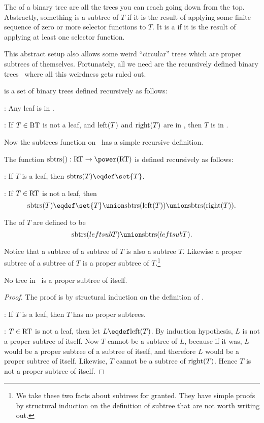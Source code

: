 The  of a binary tree are all the trees you can reach
going down from the top.  Abstractly, something is a subtree of $T$ if
it is the result of applying some finite sequence of zero or more
selector functions to $T$.  It is a  if it is the
result of applying at least one selector function.

This abstract setup also allows some weird ``circular'' trees which
are proper subtrees of themselves.  Fortunately, all we need are the
recursively defined binary trees \rectree\ where all this weirdness
gets ruled out.

\begin{definition}
\rectree is a set of binary trees defined recursively as follows:

:  Any leaf is in \rectree.

: If $T \in \text{BT}$ is not a leaf,
and $\text{left}(T)$ and $\text{right}(T)$ are in \rectree, then $T$ is in
\rectree.
\end{definition}

Now the subtrees function on \rectree\ has a simple recursive
definition.

\begin{definition}
The function $\subtrees{}: \rectree \to \power(\rectree)$ is defined recursively as follows:

: If $T$ is a leaf, then $\subtrees{T} \eqdef
\set{T}$.

: If $T \in \text{RT}$ is not a leaf,
then
\[
\subtrees{T} \eqdef \set{T} \union \subtrees{\leftsub{T}} \union
\subtrees{\rightsub{T}}.
\]

The  of $T$ are defined to be
\[
\subtrees{leftsub{T}} \union \subtrees{leftsub{T}}.
\]
\end{definition}

Notice that a subtree of a subtree of $T$ is also a subtree $T$.
Likewise a proper subtree of a subtree of $T$ is a proper subtree of
$T$.\footnote{We take these two facts about subtrees for granted.
  They have simple proofs by structural induction on the definition of
  subtree that are not worth writing out.}

\begin{lemma}\label{}
No tree in \rectree\ is a proper subtree of itself.
\end{lemma}

\begin{proof}
The proof is by structural induction on the definition of \rectree.

: If $T$ is a leaf, then $T$ has no proper
subtrees.

: $T \in \text{RT}$ is not a leaf, then
let $L \eqdef \leftsub{T}$.  By induction hypothesis, $L$ is not a
proper subtree of itself.  Now $T$ cannot be a subtree of $L$, because
if it was, $L$ would be a proper subtree of a subtree of itself, and
therefore $L$ would be a proper subtree of itself.  Likewise, $T$
cannot be a subtree of $\text{right}(T)$.  Hence $T$ is not a proper
subtree of itself.
\end{proof}

